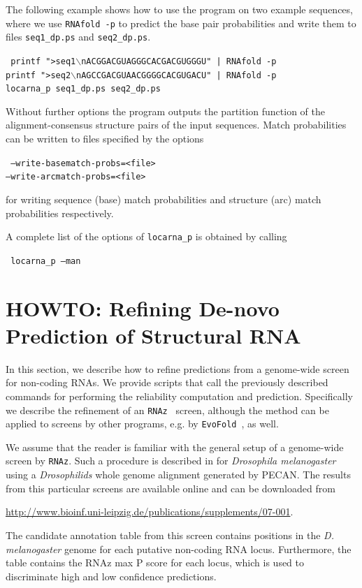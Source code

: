 \documentclass{article}
\newenvironment{ttbox}{%
  \begin{framed}\begin{minipage}{1.0\textwidth}\tt}%
{\end{minipage}\end{framed}}
\begin{document}
The following example shows how to use the program on two example
sequences, where we use \texttt{RNAfold -p} to predict the base pair
probabilities and write them to files \texttt{seq1\_dp.ps} and \texttt{seq2\_dp.ps}.
\begin{ttbox}
  printf ">seq1$\backslash{}$nACGGACGUAGGGCACGACGUGGGU" |  RNAfold -p\\
  printf ">seq2$\backslash{}$nAGCCGACGUAACGGGGCACGUGACU" |  RNAfold -p\\
  locarna\_p seq1\_dp.ps seq2\_dp.ps
\end{ttbox}
Without further options the program outputs the partition function of
the alignment-consensus structure pairs of the input sequences.
%
Match probabilities can be written to files specified by the options
\begin{ttbox}
--write-basematch-probs=<file>\\
--write-arcmatch-probs=<file>
\end{ttbox}
\noindent
for writing sequence (base) match probabilities and structure (arc) match probabilities respectively.

A complete list of the options of \texttt{locarna\_p} is obtained by calling
\begin{ttbox}
  locarna\_p --man
\end{ttbox}

\section{HOWTO: Refining De-novo Prediction of Structural RNA}

In this section, we describe how to refine predictions from a
genome-wide screen for non-coding RNAs. We provide scripts that call
the previously described commands for performing the reliability
computation and prediction. Specifically we describe the refinement of
an
\texttt{RNAz}~\cite{Washietl:Hofacker:Stadler:Fast_and_relia:PNAS2005,Washietl:Hofacker:Lukasser:Mappi_conse_RNA:2005}
screen, although the method can be applied to screens by other
programs, e.g. by
\texttt{EvoFold}~\cite{Pedersen:Bejerano:Siepel:Ident_and_Class:2006},
as well.

We assume that the reader is familiar with the general setup of a
genome-wide screen by \texttt{RNAz}. Such a procedure is described in
\cite{Rose:Hackermuller:Washietl:Compu_RNomi_droso:2007} for
\emph{Drosophila melanogaster} using a \emph{Drosophilids} whole
genome alignment generated by PECAN. The results from this particular
screens are available online and can be downloaded from
\begin{center}
  \url{http://www.bioinf.uni-leipzig.de/publications/supplements/07-001}.
\end{center}
The candidate annotation table from this screen contains positions in
the \emph{D. melanogaster} genome for each putative non-coding RNA
locus. Furthermore, the table contains the RNAz max P score for each
locus, which is used to discriminate high and low confidence
predictions.
\end{document}
